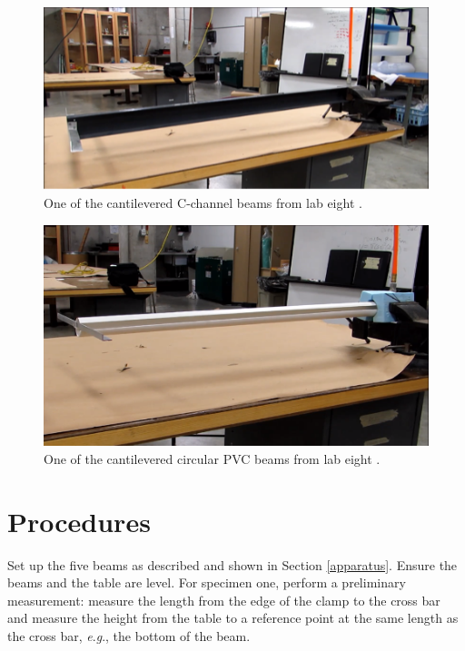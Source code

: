 \documentclass[12 pt]{report}
\newcommand{\eg}{\textit{e}.\textit{g}., }
\begin{document}
\begin{figure}[htbp]
	\centering
	\includegraphics[width=6in]{images/c-channel beam}
	\caption{One of the cantilevered C-channel beams from lab eight \cite{demo_video}.}
	\label{fig:cbar}
\end{figure}
\begin{figure}[htbp]
	\centering
	\includegraphics[width=6in]{images/circular pvc beam}
	\caption{One of the cantilevered circular PVC beams from lab eight \cite{demo_video}.}
	\label{fig:pvcbar}
\end{figure}

\section{Procedures} \label{procedures}
Set up the five beams as described and shown in Section \ref{apparatus}. Ensure the beams and the table are level. For specimen one, perform a preliminary measurement: measure the length from the edge of the clamp to the cross bar and measure the height from the table to a reference point at the same length as the cross bar, \eg the bottom of the beam.
\end{document}
